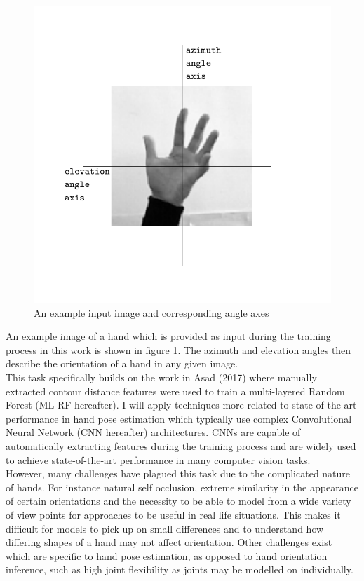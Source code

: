 \documentclass{article}
\begin{document}
\vspace*{-4mm}
\begin{figure}[h]
  \centering
  \includegraphics[scale=0.8]{example_hand2.pdf}
  \vspace*{-10mm}
  \caption{An example input image and corresponding angle axes}
  \label{fig:example_hand}
\end{figure}

An example image of a hand which is provided as input during the training process in this work is shown in figure \ref{fig:example_hand}. The azimuth and elevation angles then describe the orientation of a hand in any given image. \\

This task specifically builds on the work in Asad (2017) where manually extracted contour distance features were used to train a multi-layered Random Forest (ML-RF hereafter). I will apply techniques more related to state-of-the-art performance in hand pose estimation which typically use complex Convolutional Neural Network (CNN hereafter) architectures. CNNs are capable of automatically extracting features during the training process and are widely used to achieve state-of-the-art performance in many computer vision tasks. \\

However, many challenges have plagued this task due to the complicated nature of hands. For instance natural self occlusion, extreme similarity in the appearance of certain orientations and the necessity to be able to model from a wide variety of view points for approaches to be useful in real life situations. This makes it difficult for models to pick up on small differences and to understand how differing shapes of a hand may not affect orientation. Other challenges exist which are specific to hand pose estimation, as opposed to hand orientation inference, such as high joint flexibility as joints may be modelled on individually. \\
\end{document}
